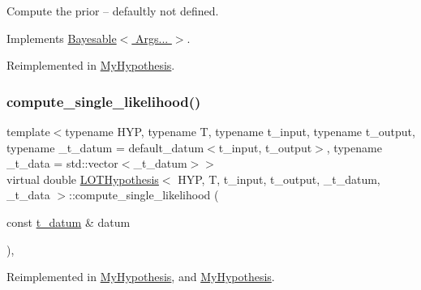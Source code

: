 Compute the prior -- defaultly not defined. 



Implements \hyperlink{class_bayesable_a9aa752f0adff1b95f8957b91fc928649}{Bayesable$<$ Args... $>$}.



Reimplemented in \hyperlink{class_my_hypothesis_a67752bb4ba61994ef0cb64f7f9031f7f}{My\+Hypothesis}.

\mbox{\label{class_l_o_t_hypothesis_aefea6d0e5d94b1fc716dedb9b25b7b26}} 
\subsubsection{\texorpdfstring{compute\+\_\+single\+\_\+likelihood()}{compute\_single\_likelihood()}}
{\footnotesize\ttfamily template$<$typename H\+YP, typename T, typename t\+\_\+input, typename t\+\_\+output, typename \+\_\+t\+\_\+datum = default\+\_\+datum$<$t\+\_\+input, t\+\_\+output$>$, typename \+\_\+t\+\_\+data = std\+::vector$<$\+\_\+t\+\_\+datum$>$$>$ \\
virtual double \hyperlink{class_l_o_t_hypothesis}{L\+O\+T\+Hypothesis}$<$ H\+YP, T, t\+\_\+input, t\+\_\+output, \+\_\+t\+\_\+datum, \+\_\+t\+\_\+data $>$\+::compute\+\_\+single\+\_\+likelihood (\begin{DoxyParamCaption}\item[{const \hyperlink{class_l_o_t_hypothesis_a26d0ecfa6a367f32276d36cd01c0cead}{t\+\_\+datum} \&}]{datum }\end{DoxyParamCaption})\hspace{0.3cm}{\ttfamily [inline]}, {\ttfamily [virtual]}}



Reimplemented in \hyperlink{class_my_hypothesis_afcc759336d7f45f01b83807481a10f42}{My\+Hypothesis}, and \hyperlink{class_my_hypothesis_a5e6bd5e0ebcb987aa4f0adf4295dba11}{My\+Hypothesis}.

\mbox{\label{class_l_o_t_hypothesis_af0274e15c0e19e8f42324b7099e2b4a1}} 
